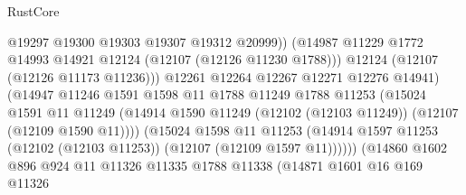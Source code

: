 \begin{lexlean}{RustCore}
\begin{coremodule}
                                      @19297
                                      @19300
                                      @19303
                                      @19307
                                      @19312
                                      @20999))
                                  (@14987
                                    @11229
                                    @1772
                                    @14993
                                    @14921
                                    @12124
                                    (@12107 (@12126 @11230 @1788)))
                                  @12124
                                  (@12107 (@12126 @11173 @11236)))
                                @12261
                                @12264
                                @12267
                                @12271
                                @12276
                                @14941)
                              (@14947
                                @11246
                                @1591
                                @1598
                                @11
                                @1788
                                @11249
                                @1788
                                @11253
                                (@15024
                                  @1591
                                  @11
                                  @11249
                                  (@14914
                                    @1590
                                    @11249
                                    (@12102 (@12103 @11249))
                                    (@12107 (@12109 @1590 @11))))
                                (@15024
                                  @1598
                                  @11
                                  @11253
                                  (@14914
                                    @1597
                                    @11253
                                    (@12102 (@12103 @11253))
                                    (@12107 (@12109 @1597 @11))))))
                            (@14860
                              @1602
                              @896
                              @924
                              @11
                              @11326
                              @11335
                              @1788
                              @11338
                              (@14871
                                @1601
                                @16
                                @169
                                @11326

\end{coremodule}
\end{lexlean}
